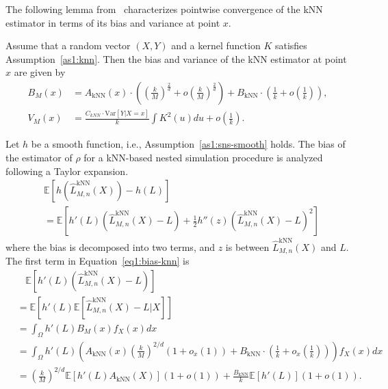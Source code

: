 The following lemma from~\cite{mack1981local} characterizes pointwise convergence of the kNN estimator in terms of its bias and variance at point $x$.

\begin{lemma}
    Assume that a random vector $(X, Y)$ and a kernel function $K$ satisfies Assumption~\ref{as1:knn}. Then the bias and variance of the kNN estimator at point $x$ are given by
    \begin{align*}
        B_M(x) & = A_{\text{kNN}}(x) \cdot \left( \left( \frac{k}{M} \right)^\frac{2}{d} + o \left( \frac{k}{M} \right)^\frac{2}{d} \right) + B_{\text{kNN}} \cdot \left(\frac{1}{k} + o\left(\frac{1}{k}\right)\right), \\
        V_M(x) & = \frac{C_{kNN} \cdot \text{Var}[Y| X = x]}{k} \int K^2(u) du + o\left(\frac{1}{k}\right).
    \end{align*}
\end{lemma}

Let $h$ be a smooth function, i.e., Assumption~\ref{as1:sns-smooth} holds.
The bias of the estimator of $\rho$ for a kNN-based nested simulation procedure is analyzed following a Taylor expansion.
\begin{align} \label{eq1:bias-knn}
    & \mathbb{E} \left[ h(\hat{L}^{\text{kNN}}_{M, n}(X)) - h(L) \right] \nonumber \\
    & = \mathbb{E} \left[ h'(L) \left( \hat{L}^{\text{kNN}}_{M, n}(X) - L \right) + \frac{1}{2} h''(z) \left( \hat{L}^{\text{kNN}}_{M, n}(X) - L \right)^2 \right] 
\end{align}
where the bias is decomposed into two terms, and $z$ is between $\hat{L}^{\text{kNN}}_{M, n}(X)$ and $L$.
The first term in Equation~\ref{eq1:bias-knn} is 
\begin{align} \label{eq1:bias-knn-1}
    & ~~~~ \mathbb{E} \left[ h'(L) \left( \hat{L}^{\text{kNN}}_{M, n}(X) - L \right) \right]  \nonumber \\
    & = \mathbb{E} \left[ h'(L) \mathbb{E}\left[ \hat{L}^{\text{kNN}}_{M, n}(X) - L |X\right] \right] \nonumber \\
    & = \int_{\Omega} h'(L) B_M(x) f_X(x) dx \nonumber \\
    & = \int_{\Omega} h'(L) \left( A_{\text{kNN}}(x) \left(\frac{k}{M}\right)^{2/d} \left(1+o_x(1)\right) + B_{\text{kNN}} \cdot \left(\frac{1}{k} + o_x\left(\frac{1}{k}\right)\right) \right) f_X(x) dx \nonumber \\
    & = \left(\frac{k}{M}\right)^{2/d} \mathbb{E} \left[ h'(L) A_{\text{kNN}}(X) \right] (1+ o(1)) + \frac{B_{\text{kNN}}}{k} \mathbb{E} \left[ h'(L) \right] (1+ o(1)).
\end{align}

